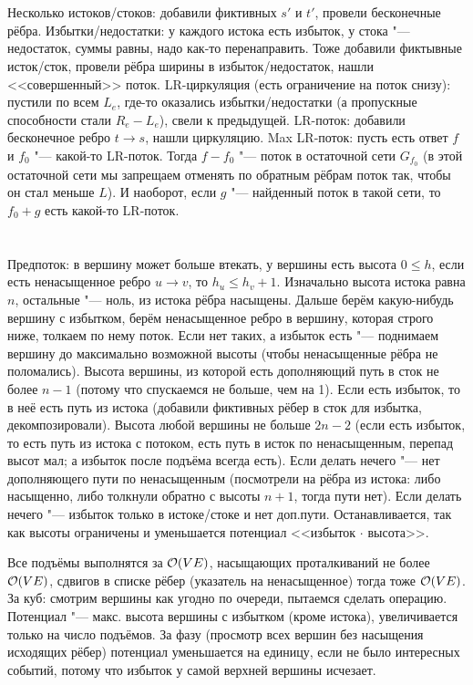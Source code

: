 \section{} %
Несколько истоков/стоков: добавили фиктивных $s'$ и $t'$, провели бесконечные рёбра.
Избытки/недостатки: у каждого истока есть избыток, у стока "--- недостаток, суммы равны, надо как-то перенаправить.
Тоже добавили фиктывные исток/сток, провели рёбра ширины в избыток/недостаток, нашли <<совершенный>> поток.
LR-циркуляция (есть ограничение на поток снизу): пустили по всем $L_e$, где-то оказались избытки/недостатки (а пропускные способности стали $R_e-L_e$), свели к предыдущей.
LR-поток: добавили бесконечное ребро $t \to s$, нашли циркуляцию.
Max LR-поток: пусть есть ответ $f$ и $f_0$ "--- какой-то LR-поток.
Тогда $f-f_0$ "--- поток в остаточной сети $G_{f_0}$ (в этой остаточной сети мы запрещаем отменять по обратным рёбрам поток так, чтобы он стал меньше $L$).
И наоборот, если $g$ "--- найденный поток в такой сети, то $f_0+g$ есть какой-то LR-поток.

\section{} %
Предпоток: в вершину может больше втекать, у вершины есть высота $0 \le h$, если есть ненасыщенное ребро $u \to v$, то $h_u \le h_v + 1$.
Изначально высота истока равна $n$, остальные "--- ноль, из истока рёбра насыщены.
Дальше берём какую-нибудь вершину с избытком, берём ненасыщенное ребро в вершину, которая строго ниже, толкаем по нему поток.
Если нет таких, а избыток есть "--- поднимаем вершину до максимально возможной высоты (чтобы ненасыщенные рёбра не поломались).
Высота вершины, из которой есть дополняющий путь в сток не более $n-1$ (потому что спускаемся не больше, чем на 1).
Если есть избыток, то в неё есть путь из истока (добавили фиктивных рёбер в сток для избытка, декомпозировали).
Высота любой вершины не больше $2n-2$ (если есть избыток, то есть путь из истока с потоком, есть путь в исток по ненасыщенным, перепад высот мал;
а избыток после подъёма всегда есть).
Если делать нечего "--- нет дополняющего пути по ненасыщенным (посмотрели на рёбра из истока: либо насыщенно, либо толкнули обратно с высоты $n+1$, тогда пути нет).
Если делать нечего "--- избыток только в истоке/стоке и нет доп.пути.
Останавливается, так как высоты ограничены и уменьшается потенциал <<избыток $\cdot$ высота>>.

Все подъёмы выполнятся за $\mathcal{O}(VE)$, насыщающих проталкиваний не более $\mathcal{O}(VE)$, сдвигов в списке рёбер (указатель на ненасыщенное) тогда тоже $\mathcal{O}(VE)$.
За куб: смотрим вершины как угодно по очереди, пытаемся сделать операцию.
Потенциал "--- макс. высота вершины с избытком (кроме истока), увеличивается только на число подъёмов.
За фазу (просмотр всех вершин без насыщения исходящих рёбер) потенциал уменьшается на единицу, если не было интересных событий, потому что избыток у самой верхней вершины исчезает.

